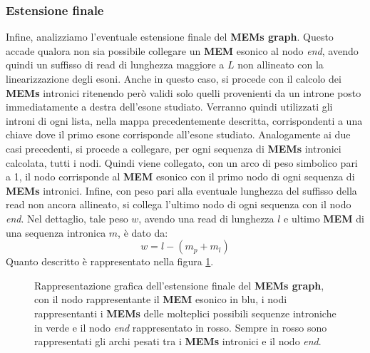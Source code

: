 \documentclass[a4paper,12pt, oneside]{book}
\begin{document}
\subsubsection{Estensione finale}
Infine, analizziamo l'eventuale estensione finale del \textbf{MEMs
  graph}. Questo accade qualora 
non sia possibile collegare un \textbf{MEM} esonico al nodo \textit{end}, avendo
quindi un suffisso di read di lunghezza maggiore a $L$ non allineato con la
linearizzazione degli esoni. Anche in questo caso, si procede con il calcolo dei
\textbf{MEMs} intronici ritenendo però validi solo quelli provenienti da un
introne posto immediatamente a destra dell'esone studiato. Verranno quindi
utilizzati gli introni di ogni lista, nella mappa precedentemente descritta,
corrispondenti a una chiave dove il primo esone corrisponde all'esone
studiato. Analogamente ai due casi precedenti, si procede a
collegare, per ogni sequenza di \textbf{MEMs} intronici calcolata, tutti i
nodi. Quindi viene collegato, con un arco di peso simbolico pari a 1, il nodo
corrisponde al \textbf{MEM} esonico con il primo nodo di ogni sequenza di
\textbf{MEMs} intronici. Infine, con peso pari alla eventuale lunghezza del
suffisso della read non ancora allineato, si collega l'ultimo nodo di ogni
sequenza con il nodo \textit{end}. Nel dettaglio, tale peso $w$, avendo una read
di lunghezza $l$ e ultimo \textbf{MEM} di una sequenza intronica $m$, è dato da:
\[w = l - (m_p + m_l)\]
Quanto descritto è rappresentato nella figura \ref{end}.
\begin{figure}
  \centering
  
  \caption{Rappresentazione grafica dell'estensione finale del \textbf{MEMs
      graph}, con il nodo rappresentante il \textbf{MEM} esonico in blu, i nodi
    rappresentanti i \textbf{MEMs} delle molteplici possibili sequenze
    introniche in verde e il nodo \textit{end} rappresentato in rosso. Sempre in
  rosso sono rappresentati gli archi pesati tra i \textbf{MEMs} intronici e il
  nodo \textit{end}.}
  \label{end}
\end{figure}
\end{document}
